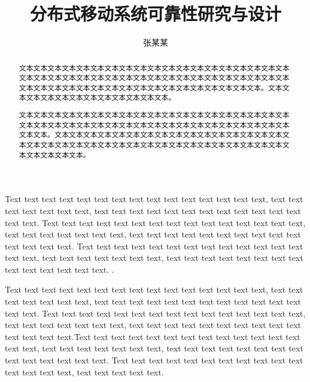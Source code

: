 \documentclass[twoside]{thesis-cls-Miya} %
\begin{document}
	
\title{分布式移动系统可靠性研究与设计}

\author{张某某}


\maketitle

\frontmatter

\begin{abstract}
文本文本文本文本文本文本文本文本文本文本文本文本文本文本文本文本文本文本文本文本文本文本文本文本文本文本文本文本文本文本文本文本文本文本文本文本文本文本文本文本文本文本文本文本文本文本文本文本文本文本文本文本文本文本文本。文本文本文本文本文本文本文本文本文本文本文本文本。

文本文本文本文本文本文本文本文本文本文本文本文本文本文本文本文本文本文本文本文本文本文本文本文本文本文本文本文本文本文本文本文本文本文本文本文本文本文本文本文本。文本文本文本文本文本文本文本文本文本文本文本文本文本文本文本文本文本文本文本文本文本文本文本文本文本文本文本文本文本文本文本文本文本文本文本文本文本文本文本文本。

\end{abstract}

\begin{englishabstract}
Text text text text text text text text text text text text text text text, text text text text text text text, text text text text text text text text text text text text text text. Text text text text text text text text text text text text text text text, text text text text text text text, text text text text text text text text text text text text text text. Text text text text text text text text text text text text text text text, text text text text text text text, text text text text text text text text text text text text text text. .

Text text text text text text text text text text text text text text text, text text text text text text text, text text text text text text text text text text text text text text. Text text text text text text text text text text text text text text text, text text text text text text text, text text text text text text text text text text text text text text.Text text text text text text text text text text text text text text text, text text text text text text text, text text text text text text text text text text text text text text. Text text text text text text text text text text text text text text text, text text text text text. 

\end{englishabstract}
\end{document}

